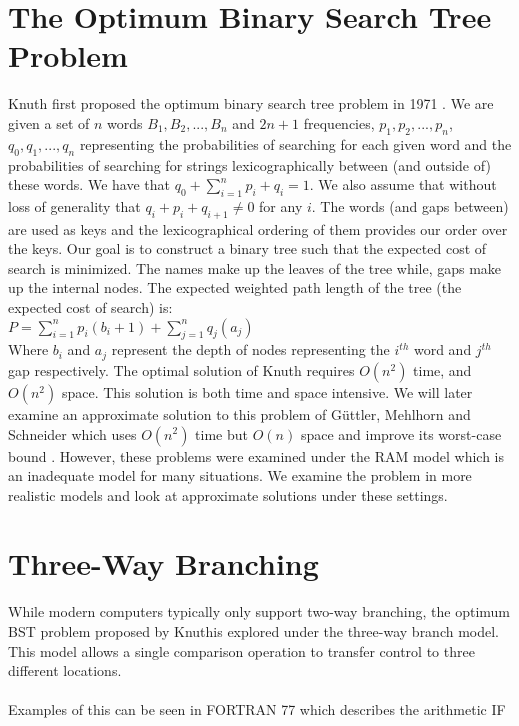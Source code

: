 \documentclass[letterpaper,12pt,titlepage,oneside,final]{book}
\theoremstyle{plain}
\begin{document}
\section{The Optimum Binary Search Tree Problem}

Knuth first proposed the optimum binary search tree problem in 1971 \cite{knuth1971optimum}. We are given a set of $n$ words $B_1, B_2, ..., B_n$ and $2n+1$ frequencies, ${p_1, p_2, ..., p_n}$, ${q_0, q_1, ..., q_n}$ representing the probabilities of searching for each given word and the probabilities of searching for strings lexicographically between (and outside of) these words. We have that $ q_0 + \sum\limits_{i=1}^n p_i+q_i = 1$. We also assume that without loss of generality that $q_i+p_i+q_{i+1} \neq 0$ for any $i$. The words (and gaps between) are used as keys and the lexicographical ordering of them provides our order over the keys. Our goal is to construct a binary tree such that the expected cost of search is minimized. The names make up the leaves of the tree while, gaps make up the internal nodes. The expected weighted path length of the tree (the expected cost of search) is: \\
$P = \sum_{i=1}^{n} p_i(b_i+1) + \sum_{j=1}^{n} q_j(a_j)$ \\
Where $b_i$ and $a_j$ represent the depth of nodes representing the $i^{th}$ word and $j^{th}$ gap respectively. The optimal solution of Knuth requires $O(n^2)$ time, and $O(n^2)$ space. This solution is both time and space intensive. We will later examine an approximate solution  to this problem of G{\"u}ttler, Mehlhorn and Schneider which uses $O(n^2)$ time but $O(n)$ space and improve its worst-case bound \cite{guttler1980binary}. However, these problems were examined under the RAM model which is an inadequate model for many situations. We examine the problem in more realistic models and look at approximate solutions under these settings.

\section{Three-Way Branching}


While modern computers typically only support two-way branching, the optimum BST problem proposed by Knuthis explored under the three-way branch model. This model allows a single comparison operation to transfer control to three different locations. \\~\\ Examples of this can be seen in FORTRAN 77 which describes the arithmetic IF \cite{fortran} \\
\end{document}
